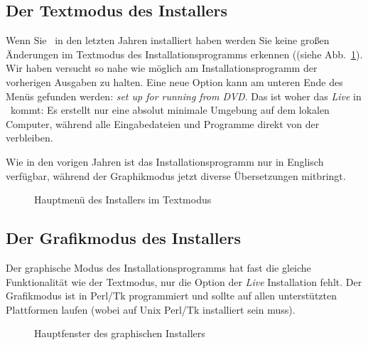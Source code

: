 \subsection{Der Textmodus des Installers}

Wenn Sie \tl\ in den letzten Jahren installiert haben werden Sie keine
großen Änderungen im Textmodus des Installationsprogramms erkennen
((siehe Abb.~\ref{fig:text_main_menu}). Wir haben versucht so nahe wie
möglich am Installationsprogramm der vorherigen Ausgaben zu halten.
Eine neue Option kann am unteren Ende des Menüs gefunden werden:
\emph{set up for running from DVD}. Das ist woher das \emph{Live} in \tl\
kommt: Es erstellt nur eine absolut minimale Umgebung auf dem lokalen
Computer, während alle Eingabedateien und Programme direkt von der
\acro{DVD} verbleiben.

Wie in den vorigen Jahren ist das Installationsprogramm nur in Englisch
verfügbar, während der Graphikmodus jetzt diverse Übersetzungen mitbringt.

\begin{figure}[htp!]
  \centering
  \caption{Hauptmenü des Installers im Textmodus}
  \label{fig:text_main_menu}
\end{figure}

\subsection{Der Grafikmodus des Installers}

Der graphische Modus des Installationsprogramms hat fast die gleiche
Funktionalität wie der Textmodus, nur die Option der \emph{Live} Installation
fehlt. Der Grafikmodus ist in Perl/Tk programmiert und sollte auf allen
unterstützten Plattformen laufen (wobei auf Unix Perl/Tk installiert
sein muss).

\begin{figure}[ht!]
  \centering
  \caption{Hauptfenster des graphischen Installers}
  \label{fig:gui_main_menu}
\end{figure}

